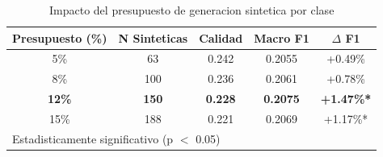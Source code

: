 \begin{table}[h]
\centering
\caption{Impacto del presupuesto de generacion sintetica por clase}
\label{tab:budget_validation}
\begin{tabular}{ccccc}
\hline
Presupuesto (\%) & N Sinteticas & Calidad & Macro F1 & $\Delta$ F1 \\
\hline
5\% & 63 & 0.242 & 0.2055 & +0.49\% \\
8\% & 100 & 0.236 & 0.2061 & +0.78\% \\
\textbf{12\%} & \textbf{150} & \textbf{0.228} & \textbf{0.2075} & \textbf{+1.47\%*} \\
15\% & 188 & 0.221 & 0.2069 & +1.17\%* \\
\hline
\multicolumn{5}{l}{\footnotesize *Estadisticamente significativo (p $<$ 0.05)} \\
\end{tabular}
\end{table}
